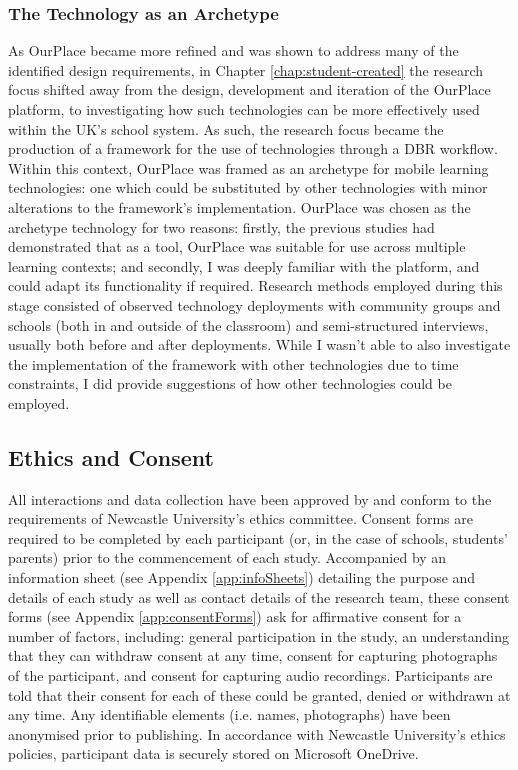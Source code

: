 \subsubsection{The Technology as an Archetype}
As OurPlace became more refined and was shown to address many of the identified design requirements, in Chapter \ref{chap:student-created} the research focus shifted away from the design, development and iteration of the OurPlace platform, to investigating how such technologies can be more effectively used within the UK's school system. As such, the research focus became the production of a framework for the use of technologies through a DBR workflow. Within this context, OurPlace was framed as an archetype for mobile learning technologies: one which could be substituted by other technologies with minor alterations to the framework's implementation. OurPlace was chosen as the archetype technology for two reasons: firstly, the previous studies had demonstrated that as a tool, OurPlace was suitable for use across multiple learning contexts; and secondly, I was deeply familiar with the platform, and could adapt its functionality if required. Research methods employed during this stage consisted of observed technology deployments with community groups and schools (both in and outside of the classroom) and semi-structured interviews, usually both before and after deployments.  While I wasn't able to also investigate the implementation of the framework with other technologies due to time constraints, I did provide suggestions of how other technologies could be employed.

\subsection{Ethics and Consent}
All interactions and data collection have been approved by and conform to the requirements of Newcastle University’s ethics committee. Consent forms are required to be completed by each participant (or, in the case of schools, students' parents) prior to the commencement of each study. Accompanied by an information sheet (see Appendix \ref{app:infoSheets}) detailing the purpose and details of each study as well as contact details of the research team, these consent forms (see Appendix \ref{app:consentForms}) ask for affirmative consent for a number of factors, including: general participation in the study, an understanding that they can withdraw consent at any time, consent for capturing photographs of the participant, and consent for capturing audio recordings. Participants are told that their consent for each of these could be granted, denied or withdrawn at any time. Any identifiable elements (i.e. names, photographs) have been anonymised prior to publishing. In accordance with Newcastle University's ethics policies, participant data is securely stored on Microsoft OneDrive.

